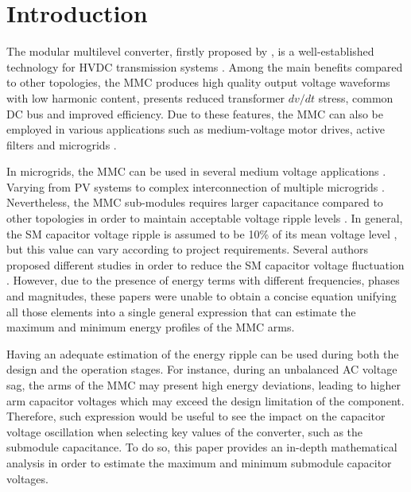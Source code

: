 \documentclass[journal]{IEEEtran}
\begin{document}
%
\IEEEpeerreviewmaketitle



\section{Introduction}
The modular multilevel converter, firstly proposed by \cite{1304403}, is a well-established technology for HVDC transmission systems \cite{ORIOL,7536194,8013775,8283706}. Among the main benefits compared to other topologies, the MMC  produces high quality output voltage waveforms with low harmonic content, presents reduced transformer $dv/dt$ stress, common DC bus and improved efficiency. Due to these features, the MMC can also be employed in various applications such as medium-voltage motor drives, active filters and microgrids \cite{8013775}.

In microgrids, the MMC can be used in several medium voltage applications \cite{8633435,8286228}. Varying from PV systems \cite{8813638,8472425} to complex interconnection of multiple microgrids \cite{8311251}. Nevertheless, the MMC sub-modules requires larger capacitance compared to other topologies in order to maintain acceptable voltage ripple levels \cite{8610380}. In general, the SM capacitor voltage ripple is assumed to be 10\% of its mean voltage level \cite{6185665}, but this value can vary according to project requirements. Several authors proposed different studies in order to reduce the SM capacitor voltage fluctuation \cite{6642060,7088606,8424186}. However, due to the presence of energy terms with different frequencies, phases and magnitudes, these papers were unable to obtain a concise equation unifying all those elements into a single general expression that can estimate the maximum and minimum energy profiles of the MMC arms.

Having an adequate estimation of the energy ripple can be used during both the design and the operation stages. For instance, during  an  unbalanced  AC  voltage  sag,  the arms of the MMC may present high energy deviations, leading to higher arm capacitor voltages which may exceed the design limitation of the component. Therefore, such expression would be useful to see the impact on the capacitor voltage oscillation when selecting key values of the converter, such as the submodule capacitance. To do so, this paper provides an in-depth mathematical analysis in order to estimate the maximum and minimum submodule capacitor voltages. 
\end{document}

